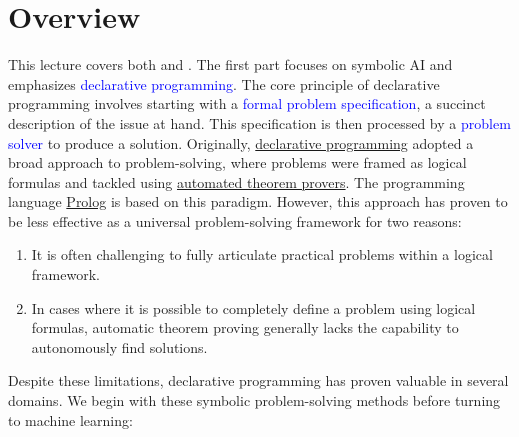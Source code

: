 \section{Overview}
This lecture covers both  and . The first part focuses on
symbolic AI and emphasizes \textcolor{blue}{declarative programming}. The core principle of declarative programming
involves starting with a \textcolor{blue}{formal problem 
specification}, a succinct description of the issue at hand. This specification is then processed by a
\textcolor{blue}{problem solver} to produce a solution. Originally,
\href{https://en.wikipedia.org/wiki/Declarative_programming}{declarative programming} adopted a broad
approach to problem-solving, where problems were framed as logical formulas and tackled using
\href{https://en.wikipedia.org/wiki/Automated_theorem_proving}{automated theorem provers}. The
programming language \href{https://en.wikipedia.org/wiki/Prolog}{Prolog} is based on this
paradigm. However, this approach has proven to be less effective as a universal problem-solving framework
for two reasons: 
\begin{enumerate}
\item It is often challenging to fully articulate practical problems within a logical framework.
\item In cases where it is possible to completely define a problem using logical formulas, automatic
       theorem proving generally lacks the capability to autonomously find solutions. 
\end{enumerate}
Despite these limitations, declarative programming has proven valuable in several domains. We begin with
these symbolic problem-solving methods before turning to machine learning:
